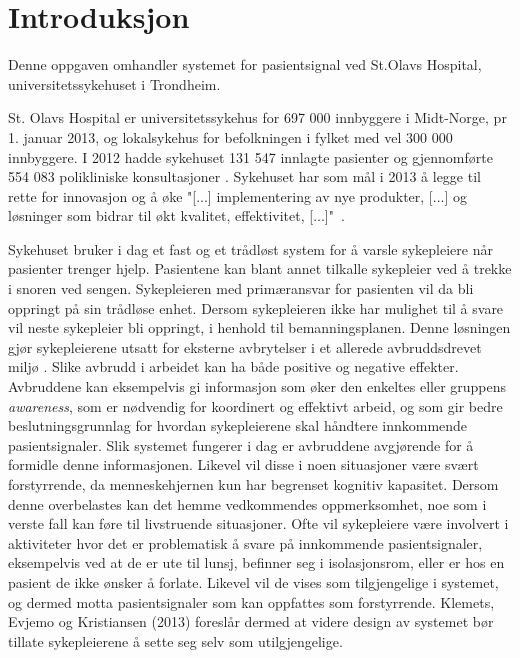 \chapter{Introduksjon}
\label{chp: introduksjon}

Denne oppgaven omhandler systemet for pasientsignal ved St.Olavs Hospital, universitetssykehuset i Trondheim. 

\noindent
St. Olavs Hospital er universitetssykehus for 697 000 innbyggere i Midt-Norge, pr 1. januar 2013, og lokalsykehus for befolkningen i fylket med vel 300 000 innbyggere. I 2012 hadde sykehuset 131 547 innlagte pasienter og gjennomførte 554 083 polikliniske konsultasjoner \cite{stolavs}. Sykehuset har som mål i 2013 å legge til rette for innovasjon og å øke "[...] implementering av nye produkter, [...] og løsninger som bidrar til økt kvalitet, effektivitet, [...]"\ \cite{styring13}.

\noindent
Sykehuset bruker i dag et fast og et trådløst system for å varsle sykepleiere når pasienter trenger hjelp. Pasientene kan blant annet tilkalle sykepleier ved å trekke i snoren ved sengen. Sykepleieren med primæransvar for pasienten vil da bli oppringt på sin trådløse enhet. Dersom sykepleieren ikke har mulighet til å svare vil neste sykepleier bli oppringt, i henhold til bemanningsplanen. Denne løsningen gjør sykepleierene utsatt for eksterne avbrytelser i et allerede avbruddsdrevet miljø \cite{Klemets12}. Slike avbrudd i arbeidet kan ha både positive og negative effekter. Avbruddene kan eksempelvis gi informasjon som øker den enkeltes eller gruppens \emph{awareness}, som er nødvendig for koordinert og effektivt arbeid, og som gir bedre beslutningsgrunnlag for hvordan sykepleierene skal håndtere innkommende pasientsignaler. Slik systemet fungerer i dag er avbruddene avgjørende for å formidle denne informasjonen. Likevel vil disse i noen situasjoner være svært forstyrrende, da menneskehjernen kun har begrenset kognitiv kapasitet. Dersom denne overbelastes kan det hemme vedkommendes oppmerksomhet, noe som i verste fall kan føre til livstruende situasjoner. Ofte vil sykepleiere være involvert i aktiviteter hvor det er problematisk å svare på innkommende pasientsignaler, eksempelvis ved at de er ute til lunsj, befinner seg i isolasjonsrom, eller er hos en pasient de ikke ønsker å forlate. Likevel vil de vises som tilgjengelige i systemet, og dermed motta pasientsignaler som kan oppfattes som forstyrrende. Klemets, Evjemo og Kristiansen (2013) foreslår dermed at videre design av systemet bør tillate sykepleierene å sette seg selv som utilgjengelige. 

